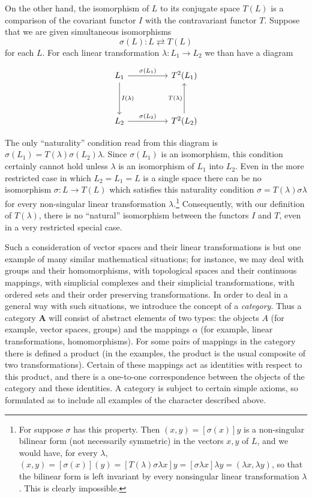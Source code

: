 \documentclass[11pt,a4paper]{report}
\begin{document}
On the other hand, the isomorphism of $L$ to its conjugate space $T(L)$ is a
comparison of the covariant functor $I$ with the contravariant functor $T$.
Suppose that we are given simultaneous isomorphisms
\begin{equation*}
	\sigma(L): L\rightleftarrows T(L)
\end{equation*}
for each $L$. For each linear transformation $\lambda:L_1 \rightarrow L_2$ we
than have a diagram
\begin{equation*}
	\begin{tikzpicture}
		\node (a) at (0,0)
		{ \begin{tikzcd}[sep=huge]
		L_1 \arrow[r,"\sigma(L_1)"] \arrow[d, "I(\lambda)"] & T^2(L_1)\\
				L_2 \arrow[r,"\sigma(L_2)"] & T^2(L_2)\arrow[u,"T(\lambda)"]
		\end{tikzcd}};
	\end{tikzpicture}
\end{equation*}
The only ``naturality'' condition read from this diagram is $\sigma(L_1)\!=\!T(\lambda)\sigma(L_2)\lambda$. %
Since $\sigma(L_1)$ is an isomorphism, this condition certainly cannot hold unless $\lambda$ is an
isomorphism of $L_1$ into $L_2$. Even in the more restricted case in which $L_2=L_1=L$ is a single space
there can be no isomorphism $\sigma:L\rightarrow T(L)$ which satisfies this naturality condition
$\sigma=T(\lambda)\sigma\lambda$ for every non\hyp{}singular linear transformation $\lambda$.\footnote{For suppose $\sigma$
has this property. Then $(x,y)=[\sigma(x)]y$ is a non-singular bilinear form (not necessarily symmetric) in the
vectors $x,y$ of $L$, and we would have, for every $\lambda$,
$(x,y)=[\sigma(x)](y)=[T(\lambda)\sigma\lambda x]y=[\sigma\lambda x]\lambda y=(\lambda x,\lambda y)$,
so that the bilinear form is left invariant by every nonsingular linear transformation $\lambda$.
This is clearly impossible.} Consequently, with our definition of $T(\lambda)$, there is no ``natural''
isomorphism between the functors $I$ and $T$, even in a very restricted special case.

Such a consideration of vector spaces and their linear transformations is but one example of many similar 
mathematical situations; for instance, we may deal with groups and their homomorphisms, with topological
spaces and their continuous mappings, with simplicial complexes and their simplicial transformations, with
ordered sets and their order preserving transformations. In order to deal in a general way with such situations,
we introduce the concept of a \emph{category}. Thus a category $\mathbf{A}$ will consist of abstract elements
of two types: the objects $A$ (for example, vector spaces, groups) and the mappings $\alpha$ (for example, linear
transformations, homomorphisms). For some pairs of mappings in the category there is defined a product (in the 
examples, the product is the usual composite of two transformations). Certain of these mappings act as identities with
respect to this product, and there is a  one\hyp{}to\hyp{}one correspondence between the objects of the category and these identities.
A category is subject to certain simple axioms, so formulated as to include all examples of the character described above.
\end{document}
